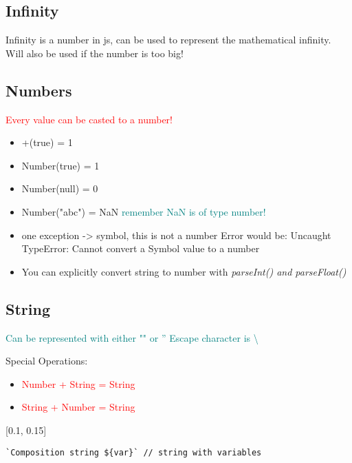 \documentclass[main.tex,fontsize=6pt,paper=a4,paper=landscape,DIV=calc,]{scrartcl}
\begin{document}
\begin{multicols*}{4}
\subsection{Infinity}  
Infinity is a number in js, can be used to represent the mathematical infinity.\newline
Will also be used if the number is too big!

\subsection{Numbers}  
\textcolor{red}{Every value can be casted to a number!}\newline
\begin{itemize}
  \item +(true) = 1
  \item Number(true) = 1
  \item Number(null) = 0
  \item Number("abc") = NaN \textcolor{teal}{remember NaN is of type number!}
  \item one exception -> symbol, this is not a number\newline
    Error would be: Uncaught TypeError: Cannot convert a Symbol value to a number
  \item You can explicitly convert string to number with \emph{parseInt() and parseFloat()} 
\end{itemize}

\subsection{String}  
\textcolor{teal}{Can be represented with either "" or ''}\newline
\textcolor{teal}{Escape character is \textbackslash}\newline
{}
{
  Special Operations:
  \begin{itemize}
  \item \textcolor{red}{Number + String = String}
  \item \textcolor{red}{String + Number = String}
  \, \newline
  \, \newline
  \, \newline
  \end{itemize} 
}[0.1, 0.15]
\vspace{-2mm}
\begin{lstlisting}
`Composition string ${var}` // string with variables
\end{lstlisting}
\vspace{2mm}


\end{multicols*}
\end{document}
